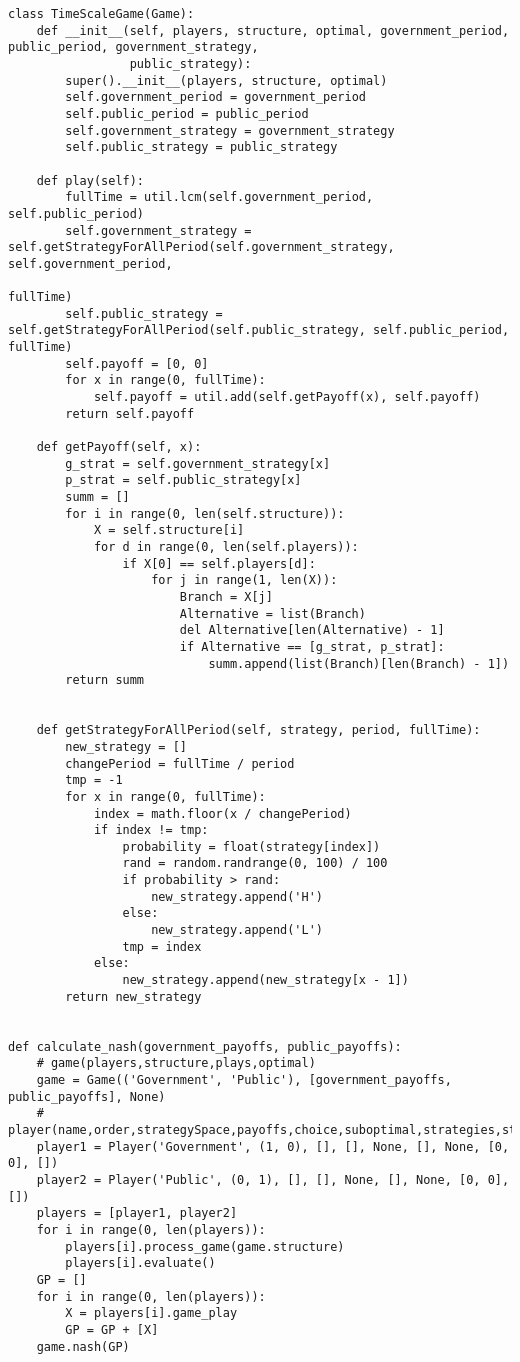 \begin{itemize}
\begin{lstlisting}[style=fsharpstyle]
class TimeScaleGame(Game):
    def __init__(self, players, structure, optimal, government_period, public_period, government_strategy,
                 public_strategy):
        super().__init__(players, structure, optimal)
        self.government_period = government_period
        self.public_period = public_period
        self.government_strategy = government_strategy
        self.public_strategy = public_strategy

    def play(self):
        fullTime = util.lcm(self.government_period, self.public_period)
        self.government_strategy = self.getStrategyForAllPeriod(self.government_strategy, self.government_period,
                                                                fullTime)
        self.public_strategy = self.getStrategyForAllPeriod(self.public_strategy, self.public_period, fullTime)
        self.payoff = [0, 0]
        for x in range(0, fullTime):
            self.payoff = util.add(self.getPayoff(x), self.payoff)
        return self.payoff

    def getPayoff(self, x):
        g_strat = self.government_strategy[x]
        p_strat = self.public_strategy[x]
        summ = []
        for i in range(0, len(self.structure)):
            X = self.structure[i]
            for d in range(0, len(self.players)):
                if X[0] == self.players[d]:
                    for j in range(1, len(X)):
                        Branch = X[j]
                        Alternative = list(Branch)
                        del Alternative[len(Alternative) - 1]
                        if Alternative == [g_strat, p_strat]:
                            summ.append(list(Branch)[len(Branch) - 1])
        return summ


    def getStrategyForAllPeriod(self, strategy, period, fullTime):
        new_strategy = []
        changePeriod = fullTime / period
        tmp = -1
        for x in range(0, fullTime):
            index = math.floor(x / changePeriod)
            if index != tmp:
                probability = float(strategy[index])
                rand = random.randrange(0, 100) / 100
                if probability > rand:
                    new_strategy.append('H')
                else:
                    new_strategy.append('L')
                tmp = index
            else:
                new_strategy.append(new_strategy[x - 1])
        return new_strategy


def calculate_nash(government_payoffs, public_payoffs):
    # game(players,structure,plays,optimal)
    game = Game(('Government', 'Public'), [government_payoffs, public_payoffs], None)
    # player(name,order,strategySpace,payoffs,choice,suboptimal,strategies,state,gameplay):
    player1 = Player('Government', (1, 0), [], [], None, [], None, [0, 0], [])
    player2 = Player('Public', (0, 1), [], [], None, [], None, [0, 0], [])
    players = [player1, player2]
    for i in range(0, len(players)):
        players[i].process_game(game.structure)
        players[i].evaluate()
    GP = []
    for i in range(0, len(players)):
        X = players[i].game_play
        GP = GP + [X]
    game.nash(GP)



\end{lstlisting}
\end{itemize}
